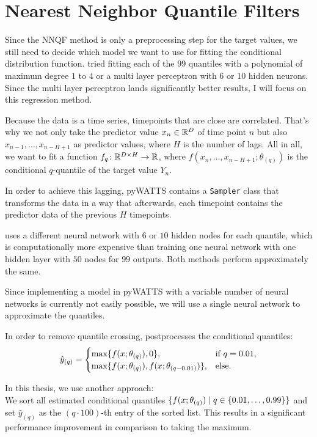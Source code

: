 \section{Nearest Neighbor Quantile Filters}
\label{sec:implementation-nnqf}

Since the NNQF method is only a preprocessing step for the target values, 
we still need to decide which model we want to use for fitting the 
conditional distribution function. 
\Textcite{Ordiano2019} tried fitting each of the \(99\) quantiles 
with a polynomial of maximum degree \(1\) to \(4\) or a multi layer perceptron 
with \(6\) or \(10\) hidden neurons. Since the multi layer perceptron lands 
significantly better results, I will focus on this regression method. 

Because the data is a time series, timepoints that are close are correlated. 
That's why we not only take the predictor value \(x_n \in \mathbb{R}^D\) of time point \(n\) 
but also \(x_{n-1}, \ldots, x_{n-H+1}\) as predictor values, where \(H\) is the number of lags.
All in all, we want to fit a function \(f_q\colon \mathbb{R}^{D\times H} \rightarrow \mathbb{R}\), 
where \( f(x_n, \ldots, x_{n-H+1}; \theta_{(q)})\) is the conditional \(q\)-quantile of the target value \(Y_n\).

In order to achieve this lagging, pyWATTS contains a \texttt{Sampler} class
that transforms the data in a way that afterwards, each timepoint contains the 
predictor data of the previous \(H\) timepoints.

\Textcite{Ordiano2019} uses a different neural network with \(6\) or \(10\) hidden nodes for each quantile, 
which is computationally more expensive than training one neural network with 
one hidden layer with \(50\) nodes for \(99\) outputs. 
Both methods perform approximately the same.  

Since implementing a model in pyWATTS with a variable number of neural networks is currently 
not easily possible, we will use a single neural network to approximate the quantiles.

In order to remove quantile crossing, \Textcite{Ordiano2019} postprocesses the conditional quantiles:
\[ \hat{y}_{(q)} = \begin{cases}
    \max\{ f(x; \theta_{(q)}), 0 \}, &\text{if } q = 0.01, \\
    \max\{ f(x; \theta_{(q)}), f(x; \theta_{(q-0.01)}) \}, &\text{else.}
\end{cases}\]

In this thesis, we use another approach: \\
We sort all estimated conditional quantiles \(\{ f(x; \theta_{(q)}) \;|\; q\in \{0.01, \ldots, 0.99\} \}\) 
and set \(\hat{y}_{(q)}\) as the \((q\cdot 100)\)-th entry of the sorted list. This results in a significant performance improvement 
in comparison to taking the maximum. 

